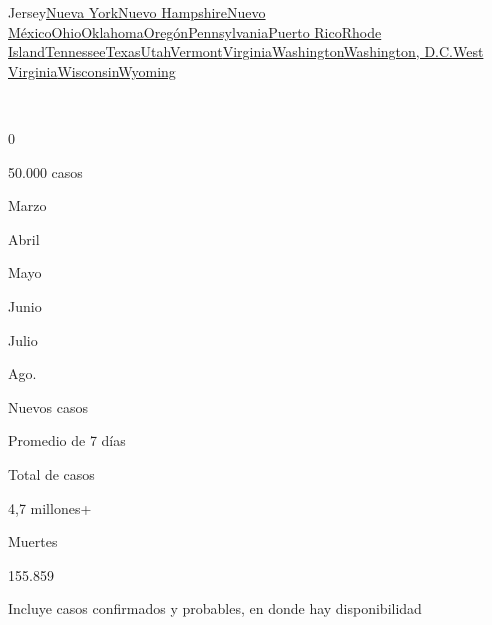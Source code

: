 {Jersey}\href{https://www.nytimes.com/interactive/2020/us/new-york-coronavirus-cases.html}{Nueva
York}\href{https://www.nytimes.com/interactive/2020/us/new-hampshire-coronavirus-cases.html}{Nuevo
Hampshire}\href{https://www.nytimes.com/interactive/2020/us/new-mexico-coronavirus-cases.html}{Nuevo
México}\href{https://www.nytimes.com/interactive/2020/us/ohio-coronavirus-cases.html}{Ohio}\href{https://www.nytimes.com/interactive/2020/us/oklahoma-coronavirus-cases.html}{Oklahoma}\href{https://www.nytimes.com/interactive/2020/us/oregon-coronavirus-cases.html}{Oregón}\href{https://www.nytimes.com/interactive/2020/us/pennsylvania-coronavirus-cases.html}{Pennsylvania}\href{https://www.nytimes.com/interactive/2020/us/puerto-rico-coronavirus-cases.html}{Puerto
Rico}\href{https://www.nytimes.com/interactive/2020/us/rhode-island-coronavirus-cases.html}{Rhode
Island}\href{https://www.nytimes.com/interactive/2020/us/tennessee-coronavirus-cases.html}{Tennessee}\href{https://www.nytimes.com/interactive/2020/us/texas-coronavirus-cases.html}{Texas}\href{https://www.nytimes.com/interactive/2020/us/utah-coronavirus-cases.html}{Utah}\href{https://www.nytimes.com/interactive/2020/us/vermont-coronavirus-cases.html}{Vermont}\href{https://www.nytimes.com/interactive/2020/us/virginia-coronavirus-cases.html}{Virginia}\href{https://www.nytimes.com/interactive/2020/us/washington-coronavirus-cases.html}{Washington}\href{https://www.nytimes.com/interactive/2020/us/washington-dc-coronavirus-cases.html}{Washington,
D.C.}\href{https://www.nytimes.com/interactive/2020/us/west-virginia-coronavirus-cases.html}{West
Virginia}\href{https://www.nytimes.com/interactive/2020/us/wisconsin-coronavirus-cases.html}{Wisconsin}\href{https://www.nytimes.com/interactive/2020/us/wyoming-coronavirus-cases.html}{Wyoming}

~

0

50.000 casos

Marzo

Abril

Mayo

Junio

Julio

Ago.

Nuevos casos

Promedio de 7 días

Total de casos

4,7 millones+

Muertes

155.859

Incluye casos confirmados y probables, en donde hay disponibilidad

